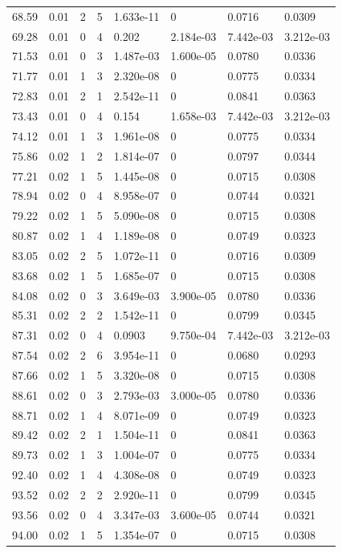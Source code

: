 \documentclass[preview]{standalone}
\begin{document}
{{{\begin{tabular}{L{1.2cm}C{1.2cm} C{0.3cm}C{0.5cm} C{1.4cm}C{1.4cm} C{1.4cm}C{1.4cm}}
  68.59  &  0.01  & 2     &  5 &  1.633e-11  & 0  & 0.0716 &  0.0309   \\ 
  69.28  &  0.01  & 0     &  4 &  0.202  & 2.184e-03  & 7.442e-03 &  3.212e-03   \\ 
  71.53  &  0.01  & 0     &  3 &  1.487e-03  & 1.600e-05  & 0.0780 &  0.0336   \\ 
  71.77  &  0.01  & 1     &  3 &  2.320e-08  & 0  & 0.0775 &  0.0334   \\ 
  72.83  &  0.01  & 2     &  1 &  2.542e-11  & 0  & 0.0841 &  0.0363   \\ 
  73.43  &  0.01  & 0     &  4 &  0.154  & 1.658e-03  & 7.442e-03 &  3.212e-03   \\ 
  74.12  &  0.01  & 1     &  3 &  1.961e-08  & 0  & 0.0775 &  0.0334   \\ 
  75.86  &  0.02  & 1     &  2 &  1.814e-07  & 0  & 0.0797 &  0.0344   \\ 
  77.21  &  0.02  & 1     &  5 &  1.445e-08  & 0  & 0.0715 &  0.0308   \\ 
  78.94  &  0.02  & 0     &  4 &  8.958e-07  & 0  & 0.0744 &  0.0321   \\ 
  79.22  &  0.02  & 1     &  5 &  5.090e-08  & 0  & 0.0715 &  0.0308   \\ 
  80.87  &  0.02  & 1     &  4 &  1.189e-08  & 0  & 0.0749 &  0.0323   \\ 
  83.05  &  0.02  & 2     &  5 &  1.072e-11  & 0  & 0.0716 &  0.0309   \\ 
  83.68  &  0.02  & 1     &  5 &  1.685e-07  & 0  & 0.0715 &  0.0308   \\ 
  84.08  &  0.02  & 0     &  3 &  3.649e-03  & 3.900e-05  & 0.0780 &  0.0336   \\ 
  85.31  &  0.02  & 2     &  2 &  1.542e-11  & 0  & 0.0799 &  0.0345   \\ 
  87.31  &  0.02  & 0     &  4 &  0.0903  & 9.750e-04  & 7.442e-03 &  3.212e-03   \\ 
  87.54  &  0.02  & 2     &  6 &  3.954e-11  & 0  & 0.0680 &  0.0293   \\ 
  87.66  &  0.02  & 1     &  5 &  3.320e-08  & 0  & 0.0715 &  0.0308   \\ 
  88.61  &  0.02  & 0     &  3 &  2.793e-03  & 3.000e-05  & 0.0780 &  0.0336   \\ 
  88.71  &  0.02  & 1     &  4 &  8.071e-09  & 0  & 0.0749 &  0.0323   \\ 
  89.42  &  0.02  & 2     &  1 &  1.504e-11  & 0  & 0.0841 &  0.0363   \\ 
  89.73  &  0.02  & 1     &  3 &  1.004e-07  & 0  & 0.0775 &  0.0334   \\ 
  92.40  &  0.02  & 1     &  4 &  4.308e-08  & 0  & 0.0749 &  0.0323   \\ 
  93.52  &  0.02  & 2     &  2 &  2.920e-11  & 0  & 0.0799 &  0.0345   \\ 
  93.56  &  0.02  & 0     &  4 &  3.347e-03  & 3.600e-05  & 0.0744 &  0.0321   \\ 
  94.00  &  0.02  & 1     &  5 &  1.354e-07  & 0  & 0.0715 &  0.0308   \\ 
\hline 
\end{tabular} 

}}}
\end{document}
